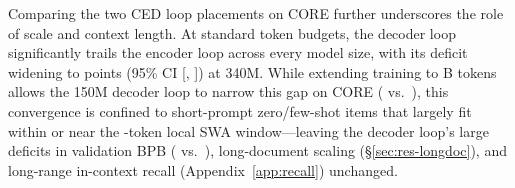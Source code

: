 Comparing the two CED loop placements on CORE further underscores the role of scale and context length. At standard token budgets, the decoder loop significantly trails the encoder loop across every model size, with its deficit widening to  points (95\% CI [, ]) at 340M. While extending training to B tokens allows the 150M decoder loop to narrow this gap on CORE ( vs.\ ), this convergence is confined to short-prompt zero/few-shot items that largely fit within or near the -token local SWA window—leaving the decoder loop's large deficits in validation BPB ( vs.\ ), long-document scaling (\S\ref{sec:res-longdoc}), and long-range in-context recall (Appendix~\ref{app:recall}) unchanged.
